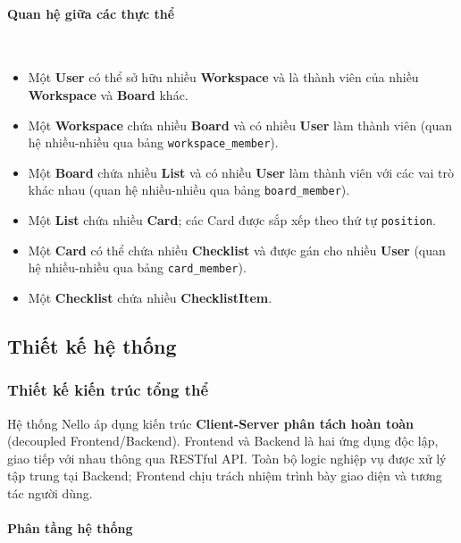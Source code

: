 \paragraph{Quan hệ giữa các thực thể} \mbox{}\\

\begin{itemize}
    \item Một \textbf{User} có thể sở hữu nhiều \textbf{Workspace} và là thành viên của nhiều \textbf{Workspace} và \textbf{Board} khác.
    \item Một \textbf{Workspace} chứa nhiều \textbf{Board} và có nhiều \textbf{User} làm thành viên (quan hệ nhiều-nhiều qua bảng \texttt{workspace\_member}).
    \item Một \textbf{Board} chứa nhiều \textbf{List} và có nhiều \textbf{User} làm thành viên với các vai trò khác nhau (quan hệ nhiều-nhiều qua bảng \texttt{board\_member}).
    \item Một \textbf{List} chứa nhiều \textbf{Card}; các Card được sắp xếp theo thứ tự \texttt{position}.
    \item Một \textbf{Card} có thể chứa nhiều \textbf{Checklist} và được gán cho nhiều \textbf{User} (quan hệ nhiều-nhiều qua bảng \texttt{card\_member}).
    \item Một \textbf{Checklist} chứa nhiều \textbf{ChecklistItem}.
\end{itemize}

\subsection{Thiết kế hệ thống}

\subsubsection{Thiết kế kiến trúc tổng thể}

Hệ thống Nello áp dụng kiến trúc \textbf{Client-Server phân tách hoàn toàn} (decoupled Frontend/Backend). Frontend và Backend là hai ứng dụng độc lập, giao tiếp với nhau thông qua RESTful API. Toàn bộ logic nghiệp vụ được xử lý tập trung tại Backend; Frontend chịu trách nhiệm trình bày giao diện và tương tác người dùng.

\paragraph{Phân tầng hệ thống} \mbox{}\\

